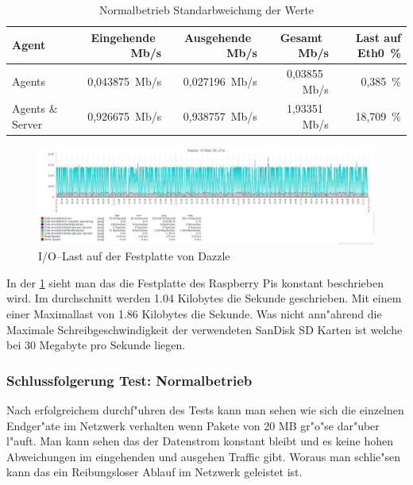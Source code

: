 \begin{table}
\centering
\begin{tabular}{l%
 r<{\,Mb/s}%
 r<{\,Mb/s}%
 r<{\,Mb/s}%
 r<{\,\%}%
}
Agent		& Eingehende            & Ausgehende            & Gesamt                & Last auf Eth0 \\
\hline
Agents		& 0,043875              & 0,027196              & 0,03855               &  0,385          \\
Agents \& Server& 0,926675		& 0,938757        	& 1,93351              & 18,709         \\
\end{tabular}
\caption{Normalbetrieb Standarbweichung der Werte}
\label{tab:standardTrafficAbweichung}
\end{table}


\begin{figure}[htbp]
\centering
\includegraphics*[width=0.9\linewidth]{Abb/ZabbixDazzle/Standard/IoStatDazzleStandard}

\caption{I/O--Last auf der Festplatte von Dazzle}
\label{fig:IoStatDazzleStandard}
\end{figure}

In der \cref{fig:IoStatDazzleStandard} sieht man das die Festplatte des Raspberry Pis konstant beschrieben wird. Im durchschnitt werden 1.04 Kilobytes %
die Sekunde geschrieben. Mit einem einer Maximallast von 1.86 Kilobytes die Sekunde. Was nicht ann"ahrend die Maximale Schreibgeschwindigkeit der verwendeten %
SanDisk SD Karten ist welche bei 30 Megabyte\autocite{san:sd} pro Sekunde liegen. 

\subsubsection{Schlussfolgerung Test: Normalbetrieb}
\label{subsubsec:schlussfolgerung:normalbetrieb}
Nach erfolgreichem durchf"uhren des Tests kann man sehen wie sich die einzelnen Endger"ate im Netzwerk verhalten wenn Pakete von 20 MB gr"o"se dar"uber l"auft. %
Man kann sehen das der Datenstrom konstant bleibt und es keine hohen Abweichungen im eingehenden und ausgehen Traffic gibt. Woraus man schlie"sen kann das %
ein Reibungsloser Ablauf im Netzwerk geleistet ist. 




